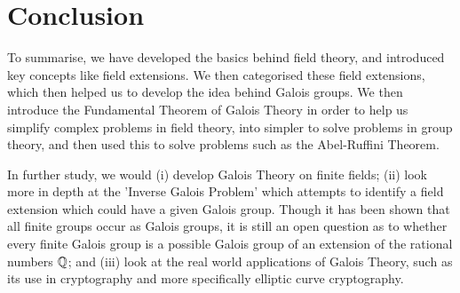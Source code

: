 \section{Conclusion}
To summarise, we have developed the basics behind field theory, and introduced key concepts like field extensions. We then categorised these field extensions, which then helped us to develop the idea behind Galois groups. We then introduce the Fundamental Theorem of Galois Theory in order to help us simplify complex problems in field theory, into simpler to solve problems in group theory, and then used this to solve problems such as the Abel-Ruffini Theorem.

In further study, we would (i) develop Galois Theory on finite fields; (ii) look more in depth at the 'Inverse Galois Problem' which attempts to identify a field extension which could have a given Galois group. Though it has been shown that all finite groups occur as Galois groups, it is still an open question as to whether every finite Galois group is a possible Galois group of an extension of the rational numbers $\mathbb Q$; and (iii) look  at the real world applications of Galois Theory, such as its use in cryptography and more specifically elliptic curve cryptography.

